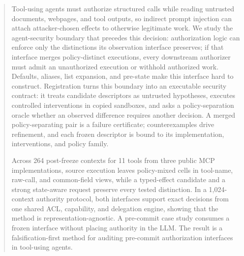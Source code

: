 \begin{abstract}
Tool-using agents must authorize structured calls while reading untrusted
documents, webpages, and tool outputs, so indirect prompt injection can attach
attacker-chosen effects to otherwise legitimate work. We study the
agent-security boundary that precedes this decision: authorization logic can
enforce only the distinctions its observation interface preserves; if that
interface merges policy-distinct executions, every downstream authorizer must
admit an unauthorized execution or withhold authorized work. Defaults, aliases,
list expansion, and pre-state make this interface hard to construct.
Registration turns this boundary into an executable security contract: it
treats candidate descriptors as untrusted hypotheses, executes controlled
interventions in copied sandboxes, and asks a policy-separation oracle whether
an observed difference requires another decision. A merged policy-separating
pair is a failure certificate; counterexamples drive refinement, and each
frozen descriptor is bound to its implementation, interventions, and policy
family.

Across 264 post-freeze contexts for 11 tools from three public MCP
implementations, source execution leaves policy-mixed cells in tool-name,
raw-call, and common-field views, while a typed-effect candidate and a strong
state-aware request preserve every tested distinction. In a 1,024-context
authority protocol, both interfaces support exact decisions from one shared
ACL, capability, and delegation engine, showing that the method is
representation-agnostic. A pre-commit case study consumes a frozen interface
without placing authority in the LLM. The result is a falsification-first
method for auditing pre-commit authorization interfaces in tool-using agents.
\end{abstract}
